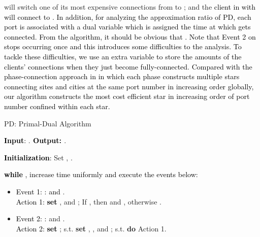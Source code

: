 \documentclass[10pt]{llncs}
\begin{document}
will switch one of its most expensive connections from 
to ; and the \textcolor{black}{client in  with
 will connect to . In addition, for analyzing
the approximation ratio of PD, each port }\textcolor{black}{{}
is associated with a dual variable  which is assigned
the time  at which }\textcolor{black}{{} gets
connected. From the algorithm, it should be obvious that .
Note that Event 2 on  stops occurring once  and
this introduces some difficulties to the analysis. To tackle these
difficulties, we use an extra variable  to
store the amounts of the clients' connections when they just become
fully-connected. Compared with the phase-connection approach in \cite{shihongftfa}
in which each phase constructs multiple stars connecting sites and
cities at the same port number in increasing order globally, our algorithm
constructs the most cost efficient star in increasing order of port
number confined within each star.}

\begin{algorithm}[H]
{\small \caption{PD: Primal-Dual Algorithm}
}{\small \par}

\textbf{\textcolor{black}{Input}}\textcolor{black}{: }.\textbf{\textcolor{black}{{}
Output: }}.

\textbf{\textcolor{black}{Initialization}}\textcolor{black}{: }Set
, .

\medskip{}


\textbf{\textcolor{black}{while}}\textcolor{black}{{} ,
increase time  uniformly and execute the events below:} 
\begin{itemize}
\item \textcolor{black}{Event 1: :
 and }.\\
\textcolor{black}{Action 1: }\textbf{\textcolor{black}{set}}\textcolor{black}{{}
}, 
and ; If , then\textbf{
} and
, otherwise .\textcolor{black}{{}
}\smallskip{}

\item \textcolor{black}{Event 2: : }
and .\\
\textcolor{black}{Action 2: }\textbf{\textcolor{black}{set}}\textcolor{black}{{}
}; 
s.t. 
\textbf{set} ,
, 
and ;
 s.t.  \textbf{do}
Action 1.\end{itemize}
\end{algorithm}
\end{document}
